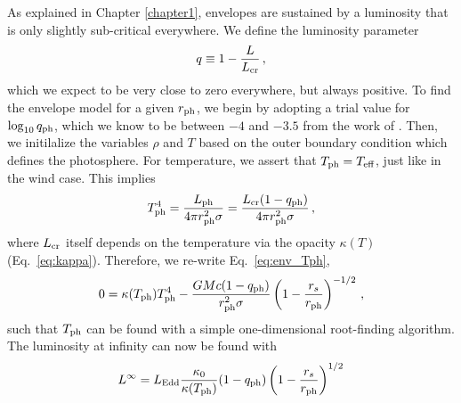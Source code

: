 \documentclass[../main.tex]{subfiles}
\begin{document}
As explained in Chapter \ref{chapter1}, envelopes are sustained by a luminosity that is only slightly sub-critical everywhere. We define the luminosity parameter
\begin{equation}\label{eq:env_qparam}
    q\equiv 1-\frac{L}{L_\text{cr}}\,,
\end{equation}
which we expect to be very close to zero everywhere, but always positive. To find the envelope model for a given $r_\text{ph}$, we begin by adopting a trial value for $\log_{10}q_\text{ph}$, which we know to be between $-4$ and $-3.5$ from the work of \citet{Paczynski1986a}. Then, we initilalize the variables $\rho$ and $T$ based on the outer boundary condition which defines the photosphere. For temperature, we assert that $T_\text{ph}=T_\text{eff}$, just like in the wind case. This implies
\begin{equation}\label{eq:env_Tph}
    T_\text{ph}^4=\frac{L_\text{ph}}{4\pi r_\text{ph}^2\sigma}=\frac{L_\text{cr}(1-q_\text{ph})}{4\pi r_\text{ph}^2\sigma}\,,
\end{equation}
where $L_\text{cr}$ itself depends on the temperature via the opacity $\kappa(T)$ (Eq.~\ref{eq:kappa}). Therefore, we re-write Eq.~\eqref{eq:env_Tph},
\begin{equation}
    0=\kappa(T_\text{ph})T_\text{ph}^4-\frac{GMc(1-q_\text{ph})}{r_\text{ph}^2\sigma}\left(1-\frac{r_s}{r_\text{ph}}\right)^{-1/2}\,,
\end{equation}
such that $T_\text{ph}$ can be found with a simple one-dimensional root-finding algorithm. The luminosity at infinity can now be found with
\begin{equation}\label{eq:env_Linf}
    L^\infty=L_\text{Edd} \frac{\kappa_0}{\kappa(T_\text{ph})}(1-q_\text{ph})\left(1-\frac{r_s}{r_\text{ph}}\right)^{1/2}
\end{equation}
\end{document}
